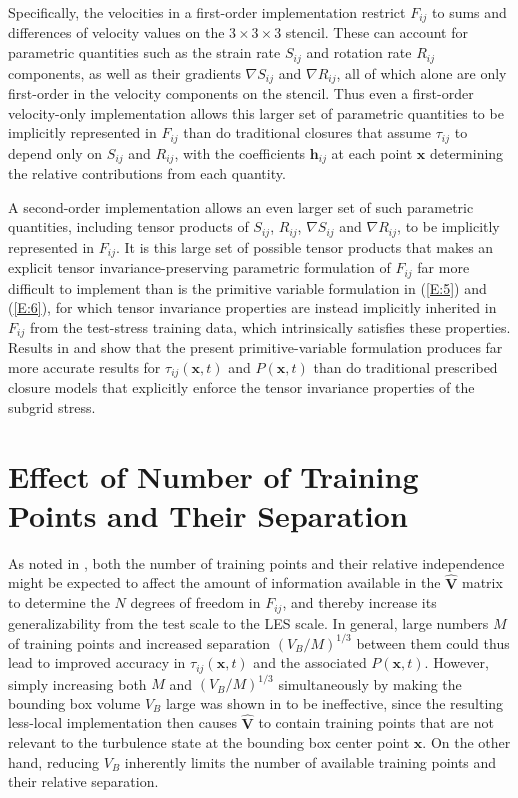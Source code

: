 Specifically, the velocities in a first-order implementation restrict  $F_{ij}$ to sums and differences of velocity values on the $3 \times 3 \times 3$  stencil. These can account for parametric quantities such as the strain rate $S_{ij}$  and rotation rate  $R_{ij}$ components, as well as their gradients $\nabla S_{ij}$  and $\nabla R_{ij}$, all of which alone are only first-order in the velocity components on the stencil. Thus even a first-order velocity-only implementation allows this larger set of parametric quantities to be implicitly represented in $F_{ij}$  than do traditional closures that assume $\tau_{ij}$  to depend only on $S_{ij}$  and $R_{ij}$, with the coefficients $\mathbf{h}_{ij}$  at each point $\mathbf{x}$ determining the relative contributions from each quantity. 

A second-order implementation allows an even larger set of such parametric quantities, including tensor products of $S_{ij}$, $R_{ij}$,  $\nabla S_{ij}$ and $\nabla R_{ij}$, to be implicitly represented in $F_{ij}$. It is this large set of possible tensor products that makes an explicit tensor invariance-preserving parametric formulation of  $F_{ij}$ far more difficult to implement than is the primitive variable formulation in (\ref{E:5}) and (\ref{E:6}), for which tensor invariance properties are instead implicitly inherited in $F_{ij}$  from the test-stress training data, which intrinsically satisfies these properties. Results in  and  show that the present primitive-variable formulation produces far more accurate results for  $\tau_{ij}(\mathbf{x},t)$ and $P(\mathbf{x},t)$  than do traditional prescribed closure models that explicitly enforce the tensor invariance properties of the subgrid stress.

\section{Effect of Number of Training Points and Their Separation}
\label{sec:IVE}

As noted in , both the number of training points and their relative independence might be expected to affect the amount of information available in the $\widehat{\mathbf{V}}$  matrix to determine the $N$ degrees of freedom in $F_{ij}$, and thereby increase its generalizability from the test scale to the LES scale. In general, large numbers $M$ of training points and increased separation $(V_B/M)^{1/3}$  between them could thus lead to improved accuracy in $\tau_{ij}(\mathbf{x},t)$  and the associated  $P(\mathbf{x},t)$. However, simply increasing both $M$ and $(V_B/M)^{1/3}$  simultaneously by making the bounding box volume  $V_B$ large was shown in  to be ineffective, since the resulting less-local implementation then causes $\widehat{\mathbf{V}}$ to contain training points that are not relevant to the turbulence state at the bounding box center point $\mathbf{x}$. On the other hand, reducing  $V_B$ inherently limits the number of available training points and their relative separation. 


